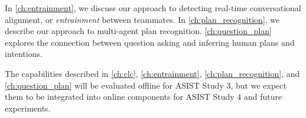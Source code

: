 In \autoref{ch:entrainment}, we discuss our approach to detecting real-time
conversational alignment, or \emph{entrainment} between teammates. In
\autoref{ch:plan_recognition}, we describe our approach to multi-agent plan
recognition. \autoref{ch:question_plan} explores the connection between
question asking and inferring human plans and intentions. 

The capabilities described in \autoref{ch:clc}, \autoref{ch:entrainment},
\autoref{ch:plan_recognition}, and \autoref{ch:question_plan} will be evaluated
offline for ASIST Study 3, but we expect them to be integrated into online
components for ASIST Study 4 and future experiments.
